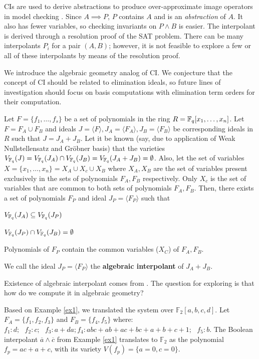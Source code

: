 CIs are used to derive abstractions to produce over-approximate image
operators in model checking \cite{mcmillan2003interpolation}. Since $A
\implies P$, $P$ contains $A$ and is an {\it abstraction} of $A$. It
also has fewer variables, so checking  invariants on $P \wedge B$ is
easier. The interpolant is derived through a resolution proof of the
SAT problem. There can be many interpolants $P_i$ for a pair $(A,B)$; 
however, it is not feasible to explore a few or all of these
interpolants by means of the resolution proof. 


We introduce the algebraic geometry analog of CI.
We conjecture that the
  concept of CI should be related to elimination ideals, so future lines
  of investigation should focus on \Grobner basis computations with
  elimination term orders for their computation.



\begin{Definition}\label{ci}
Let $F = \{f_1, \dots, f_s\}$ be a set of polynomials in the ring 
$R = {\mathbb{F}}_{q}[x_1,\dots,x_n]$. Let $F = F_A \cup F_B$ and ideals $J =
\langle F \rangle, J_A = \langle F_A \rangle, J_B = \langle F_B
\rangle$ be corresponding ideals in $R$ such that $J = J_A + J_B$. Let
it be known (say, due to application of Weak Nullstellensatz and
Gr\"obner basis) that the varieties $V_{{\mathbb{F}}_{q}}(J) = V_{{\mathbb{F}}_{q}}(J_A) \cap
V_{{\mathbb{F}}_{q}}(J_B) =V_{{\mathbb{F}}_{q}}(J_A+J_B)=\emptyset$. Also, let the set of
variables $X = \{x_1,\dots,x_n\} = X_A \cup X_c \cup X_B$ where $X_A,
X_B$ are the set of variables present exclusively in the sets of
polynomials $F_A, F_B$ respectively. Only $X_c$ is the set of
variables that are common to both sets of polynomials $F_A,
F_B$. Then, there exists a set of polynomials  $F_P$ and ideal $J_P =
\langle F_P \rangle$ such that 
\bi
\item $V_{{\mathbb{F}}_{q}}(J_A) \subseteq V_{{\mathbb{F}}_{q}}(J_P)$
\item $V_{{\mathbb{F}}_{q}}(J_P) \cap V_{{\mathbb{F}}_{q}}(J_B) = \emptyset$
\item Polynomials of $F_P$ contain the common variables ($X_C$) of
  $F_A, F_B$. 
\ei

We call the ideal $J_P = \langle F_P\rangle$ the {\bf algebraic
  interpolant} of  $J_A+J_B$. 
\end{Definition}

Existence of algebraic interpolant comes from \cite{craig-interpolate}.
The question for exploring is that how do we compute it in algebraic geometry?

\begin{Example} \label{ex2}
Based on Example \ref{ex1}, we translated the system over
$\mathbb{F}_2[a, b, c, d]$. Let $F_A = \{f_1, f_2, f_3\}$ and $F_B =
\{f_4, f_5\}$ where: $f_1: d; ~~~f_2: c; ~~~f_3: a + da; f_4:  abc +
ab + ac + bc + a + b + c + 1; ~~~f_5: b.$ The Boolean interpolant
$\overline{a}\wedge\overline{c}$ from Example \ref{ex1} translates to
${\mathbb{F}}_2$ as the polynomial $f_p = ac + a + c$, with its
variety $V(f_p) = \{a=0, c=0\}$.   
\end{Example}

